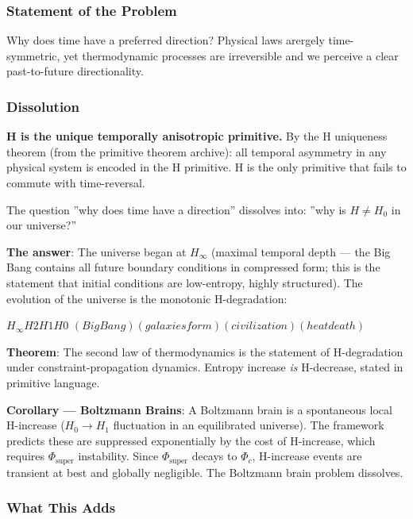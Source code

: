 \documentclass[12pt,a4paper]{article}
\begin{document}
\subsubsection{Statement of the Problem}

Why does time have a preferred direction? Physical laws arergely time-symmetric, yet thermodynamic processes are irreversible and we perceive a clear past-to-future directionality.

\subsubsection{Dissolution}

\textbf{H is the unique temporally anisotropic primitive.} By the H uniqueness theorem (from the primitive theorem archive): all temporal asymmetry in any physical system is encoded in the H primitive. H is the only primitive that fails to commute with time-reversal.

The question ''why does time have a direction'' dissolves into: ''why is $H \neq H_0$ in our universe?''

\textbf{The answer}: The universe began at $H_{\infty}$ (maximal temporal depth --- the Big Bang contains all future boundary conditions in compressed form; this is the statement that initial conditions are low-entropy, highly structured). The evolution of the universe is the monotonic H-degradation:

$H_{\infty}  $\rightarrow$  H2  $\rightarrow$  H1  $\rightarrow$  H0$
$(Big Bang)  (galaxies form)  (civilization)  (heat death)$

\textbf{Theorem}: The second law of thermodynamics is the statement of H-degradation under constraint-propagation dynamics. Entropy increase \emph{is} H-decrease, stated in primitive language.

\textbf{Corollary --- Boltzmann Brains}: A Boltzmann brain is a spontaneous local H-increase ($H_0 \to H_1$ fluctuation in an equilibrated universe). The framework predicts these are suppressed exponentially by the cost of H-increase, which requires $\Phi_{\text{super}}$ instability. Since $\Phi_{\text{super}}$ decays to $\Phi_c$, H-increase events are transient at best and globally negligible. The Boltzmann brain problem dissolves.

\subsubsection{What This Adds}
\end{document}
